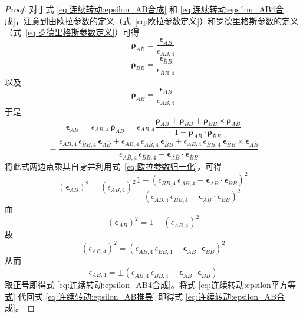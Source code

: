 \begin{proof}
对于式 \eqref{eq:连续转动:epsilon_AB合成} 和 \eqref{eq:连续转动:epsilon_AB4合成}，注意到由欧拉参数的定义（式~\eqref{eq:欧拉参数定义}）和罗德里格斯参数的定义（式~\eqref{eq:罗德里格斯参数定义}）可得
\begin{equation}\label{eq:连续转动:rho_Abar_B}
\bm{\rho}_{A\bar B}=\frac{\bm{\epsilon}_{A\bar B}}{\epsilon_{A\bar B,4}}
\end{equation}
\begin{equation}\label{eq:连续转动:rho_Bar_B_B}
\bm{\rho}_{\bar B B}=\frac{\bm{\epsilon}_{\bar B B}}{\epsilon_{\bar B B,4}}
\end{equation}
以及
\begin{equation}\label{eq:连续转动:rho_AB}
\bm{\rho}_{AB}=\frac{\bm{\epsilon}_{AB}}{\epsilon_{AB,4}}
\end{equation}
于是
\begin{equation}\label{eq:连续转动:epsilon_AB推导}
\bm{\epsilon}_{AB}=\,\epsilon_{AB,4}\,\bm{\rho}_{AB}=\,\epsilon_{AB,4}\frac{\bm{\rho}_{A\bar B}+\bm{\rho}_{\bar B B}+\bm{\rho}_{\bar B B}\times\bm{\rho}_{A\bar B}}{1-\bm{\rho}_{A\bar B}\cdot\bm{\rho}_{\bar B B}}
\end{equation}
$$
=\frac{\epsilon_{AB,4}\,\epsilon_{\bar B B,4}\,\bm{\epsilon}_{A\bar B}+\epsilon_{AB,4}\,\epsilon_{A\bar B,4}\,\bm{\epsilon}_{\bar B B}+\epsilon_{AB,4}\,\epsilon_{\bar B B,4}\,\bm{\epsilon}_{\bar B B}\times\bm{\epsilon}_{A\bar B}}{\epsilon_{A\bar B,4}\,\epsilon_{\bar B B,4}-\bm{\epsilon}_{A\bar B}\cdot\bm{\epsilon}_{\bar B B}}
$$
将此式两边点乘其自身并利用式~\eqref{eq:欧拉参数归一化}，可得
\begin{equation}\label{eq:连续转动:epsilon模平方}
(\bm{\epsilon}_{AB})^{2}=(\epsilon_{AB,4})^{2}\frac{1-(\epsilon_{\bar B B,4}\,\epsilon_{A\bar B,4}-\bm{\epsilon}_{A\bar B}\cdot\bm{\epsilon}_{\bar B B})^{2}}{(\epsilon_{A\bar B,4}\,\epsilon_{\bar B B,4}-\bm{\epsilon}_{A\bar B}\cdot\bm{\epsilon}_{\bar B B})^{2}}
\end{equation}
而
\begin{equation}\label{eq:连续转动:epsilon模平方约束}
(\bm{\epsilon}_{AB})^{2}=1-(\epsilon_{AB,4})^{2}
\end{equation}
故
\begin{equation}\label{eq:连续转动:epsilon平方等式}
(\epsilon_{AB,4})^{2}=(\epsilon_{A\bar B,4}\,\epsilon_{\bar B B,4}-\bm{\epsilon}_{A\bar B}\cdot\bm{\epsilon}_{\bar B B})^{2}
\end{equation}
从而
$$
\epsilon_{AB,4}=\pm(\epsilon_{A\bar B,4}\,\epsilon_{\bar B B,4}-\bm{\epsilon}_{A\bar B}\cdot\bm{\epsilon}_{\bar B B})
$$
取正号即得式 \eqref{eq:连续转动:epsilon_AB4合成}。将式 \eqref{eq:连续转动:epsilon平方等式} 代回式 \eqref{eq:连续转动:epsilon_AB推导} 即得式 \eqref{eq:连续转动:epsilon_AB合成}。


\end{proof}

